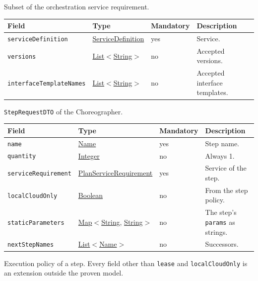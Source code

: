 \documentclass[a4paper]{arrowhead}
\newcommand{\mref}[1]{{\textcolor{ArrowheadPurple}{\hyperref[sec:model:#1]{#1}}}}
\newcommand{\pref}[1]{{\textcolor{ArrowheadGrey}{\hyperref[sec:model:primitives:#1]{#1}}}}
\begin{document}
Subset of the orchestration service requirement.

{\small
\begin{longtable}{|p{3.7cm}|p{4.2cm}|p{1.6cm}|p{6.3cm}|}

\hline
\rowcolor{gray!33} Field & Type & Mandatory & Description \\ \hline
\endhead
\texttt{serviceDefinition} & \pref{ServiceDefinition} & yes & Service. \\ \hline
\texttt{versions} & \pref{List}$<$\pref{String}$>$ & no & Accepted versions. \\ \hline
\texttt{interfaceTemplateNames} & \pref{List}$<$\pref{String}$>$ & no & Accepted interface templates. \\ \hline
\end{longtable}
}

\texttt{StepRequestDTO} of the Choreographer.

{\small
\begin{longtable}{|p{3.7cm}|p{4.2cm}|p{1.6cm}|p{6.3cm}|}

\hline
\rowcolor{gray!33} Field & Type & Mandatory & Description \\ \hline
\endhead
\texttt{name} & \pref{Name} & yes & Step name. \\ \hline
\texttt{quantity} & \pref{Integer} & no & Always 1. \\ \hline
\texttt{serviceRequirement} & \mref{PlanServiceRequirement} & yes & Service of the step. \\ \hline
\texttt{localCloudOnly} & \pref{Boolean} & no & From the step policy. \\ \hline
\texttt{staticParameters} & \pref{Map}$<$\pref{String}, \pref{String}$>$ & no & The step's \texttt{params} as strings. \\ \hline
\texttt{nextStepNames} & \pref{List}$<$\pref{Name}$>$ & no & Successors. \\ \hline
\end{longtable}
}

Execution policy of a step. Every field other than \texttt{lease} and \texttt{localCloudOnly} is an extension outside the proven model.
\end{document}
